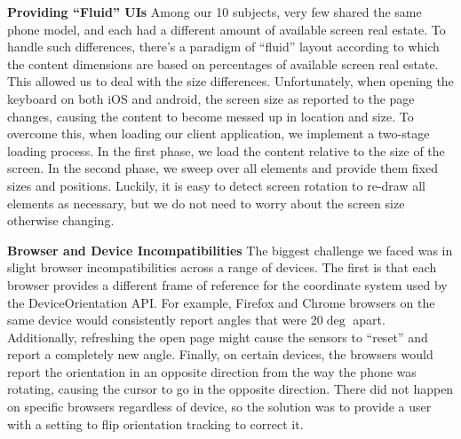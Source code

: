 \textbf{Providing ``Fluid'' UIs} Among our 10 subjects, very few shared
the same phone model, and each had a different amount of
available screen real estate. To handle such differences,
there's a paradigm of ``fluid'' layout according to which the content
dimensions are based on percentages of available screen real estate. This
allowed us to deal with the size differences. Unfortunately, when
opening the keyboard on both iOS and android, the screen size as
reported to the page changes, causing the content to become messed up
in location and size. To overcome this, when loading our client
application, we implement a two-stage loading process. In the
first phase, we load the content relative to the size of the screen.
In the second phase, we sweep over all elements and provide them
fixed sizes and positions. Luckily, it is easy to detect screen
rotation to re-draw all elements as necessary, but we do not need to
worry about the screen size otherwise changing.

\textbf{Browser and Device Incompatibilities} The biggest challenge
we faced was in slight browser incompatibilities across a range of
devices. The first is that each browser provides a different frame
of reference for the coordinate system used by the DeviceOrientation
API. For example, Firefox and Chrome browsers on the same device would
consistently report angles that were 20$\deg$ apart. Additionally,
refreshing the open page might cause the sensors to ``reset'' and report
a completely new angle. Finally, on certain devices, the browsers
would report the orientation in an opposite direction from the way
the phone was rotating, causing the cursor to go in the opposite
direction. There did not happen on specific browsers regardless of
device, so the solution was to provide a user with a setting to
flip orientation tracking to correct it.

